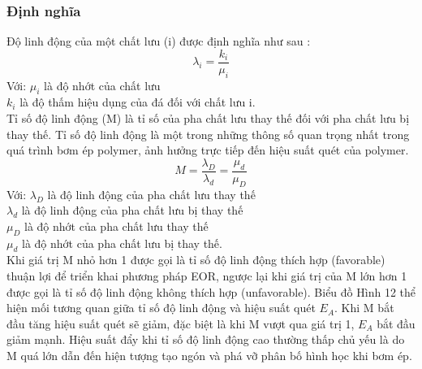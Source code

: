 \documentclass[12pt,a4paper]{article}
\begin{document}
	\subsubsection{Định nghĩa}
	Độ linh động của một chất lưu (i) được định nghĩa như sau \cite{kantzas2012fundamentals}:
		\begin{equation}
			\lambda_i = \frac{k_i}{\mu_i}
		\end{equation}
	Với:\hspace{15pt} $\mu_i$ là độ nhớt của chất lưu\\
		 \hspace*{37pt}$k_i$ là độ thấm hiệu dụng của đá đối với chất lưu i.\\
	Tỉ số độ linh động (M) \cite{kantzas2012fundamentals} là tỉ số của pha chất lưu thay thế đối với pha chất lưu bị thay thế. Tỉ số độ linh động là một trong những thông số quan trọng nhất trong quá trình bơm ép polymer, ảnh hưởng trực tiếp đến hiệu suất quét của polymer.
		\begin{equation*}
			M = \frac{\lambda_D}{\lambda_d} = \frac{\mu_d}{\mu_D}
		\end{equation*}
	Với: \hspace{15pt}$\lambda_D$ là độ linh động của pha chất lưu thay thế\\
	\hspace*{37pt}$\lambda_d$ là độ linh động của pha chất lưu bị thay thế\\
	\hspace*{37pt}$\mu_D$ là độ nhớt của pha chất lưu thay thế\\
	\hspace*{37pt}$\mu_d$ là độ nhớt của pha chất lưu bị thay thế.\\
	Khi giá trị M nhỏ hơn 1 được gọi là tỉ số độ linh động thích hợp (favorable) thuận lợi để triển khai phương pháp EOR, ngược lại khi giá trị của M lớn hơn 1 được gọi là tỉ số độ linh động không thích hợp (unfavorable). Biểu đồ Hình 12 thể hiện mối tương quan giữa tỉ số độ linh động và hiệu suất quét $E_A$. Khi M bắt đầu tăng hiệu suất quét sẽ giảm, đặc biệt là khi M vượt qua giá trị 1, $E_A$ bắt đầu giảm mạnh. Hiệu suất đẩy khi tỉ số độ linh động cao thường thấp chủ yếu là do M quá lớn dẫn đến hiện tượng tạo ngón và phá vỡ phân bố hình học khi bơm ép. 
\end{document}
